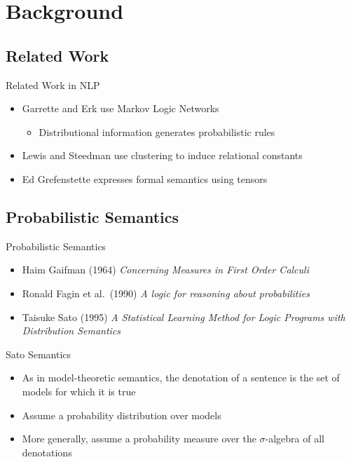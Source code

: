 \documentclass{beamer}
\newlength{\wideitemsep}
\let\olditem\item
\renewcommand{\item}{\setlength{\itemsep}{\wideitemsep}\olditem}
\begin{document}
\section{Background}

\subsection{Related Work}

\begin{frame}{Related Work in NLP}
\begin{itemize}
\item Garrette and Erk use Markov Logic Networks
\begin{itemize}
\item Distributional information generates probabilistic rules
\end{itemize}
\item Lewis and Steedman use clustering to induce relational constants
\item Ed Grefenstette expresses formal semantics using tensors
\end{itemize}
\end{frame}


\subsection{Probabilistic Semantics}

\begin{frame}{Probabilistic Semantics}
\begin{itemize}
\item Haim Gaifman (1964) \textit{Concerning Measures in First Order Calculi}
\item Ronald Fagin et al.~(1990) \textit{A logic for reasoning about probabilities}
\item Taisuke Sato (1995) \textit{A Statistical Learning Method for Logic Programs with Distribution Semantics}
\end{itemize}
\end{frame}

\begin{frame}{Sato Semantics}
\begin{itemize}
\item As in model-theoretic semantics, the denotation of a sentence is
  the set of models for which it is true
\item Assume a probability distribution over models
\item More generally, assume a probability measure over the $\sigma$-algebra of all denotations
\end{itemize}
\end{frame}
\end{document}

